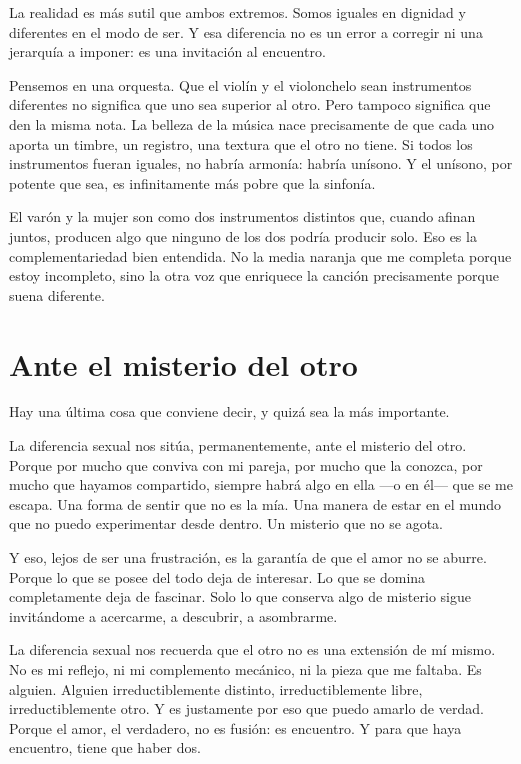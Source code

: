 La realidad es más sutil que ambos extremos. Somos iguales en dignidad y diferentes en el modo de ser. Y esa diferencia no es un error a corregir ni una jerarquía a imponer: es una invitación al encuentro.

Pensemos en una orquesta. Que el violín y el violonchelo sean instrumentos diferentes no significa que uno sea superior al otro. Pero tampoco significa que den la misma nota. La belleza de la música nace precisamente de que cada uno aporta un timbre, un registro, una textura que el otro no tiene. Si todos los instrumentos fueran iguales, no habría armonía: habría unísono. Y el unísono, por potente que sea, es infinitamente más pobre que la sinfonía.

El varón y la mujer son como dos instrumentos distintos que, cuando afinan juntos, producen algo que ninguno de los dos podría producir solo. Eso es la complementariedad bien entendida. No la media naranja que me completa porque estoy incompleto, sino la otra voz que enriquece la canción precisamente porque suena diferente.

\section{Ante el misterio del otro}

Hay una última cosa que conviene decir, y quizá sea la más importante.

La diferencia sexual nos sitúa, permanentemente, ante el misterio del otro. Porque por mucho que conviva con mi pareja, por mucho que la conozca, por mucho que hayamos compartido, siempre habrá algo en ella ---o en él--- que se me escapa. Una forma de sentir que no es la mía. Una manera de estar en el mundo que no puedo experimentar desde dentro. Un misterio que no se agota.

Y eso, lejos de ser una frustración, es la garantía de que el amor no se aburre. Porque lo que se posee del todo deja de interesar. Lo que se domina completamente deja de fascinar. Solo lo que conserva algo de misterio sigue invitándome a acercarme, a descubrir, a asombrarme.

La diferencia sexual nos recuerda que el otro no es una extensión de mí mismo. No es mi reflejo, ni mi complemento mecánico, ni la pieza que me faltaba. Es alguien. Alguien irreductiblemente distinto, irreductiblemente libre, irreductiblemente otro. Y es justamente por eso que puedo amarlo de verdad. Porque el amor, el verdadero, no es fusión: es encuentro. Y para que haya encuentro, tiene que haber dos.

